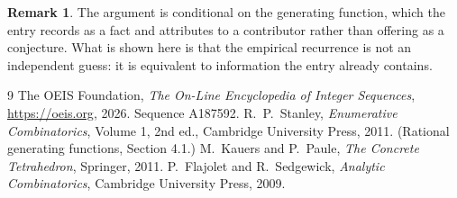 \documentclass[11pt,a4paper]{article}
\theoremstyle{plain}
\theoremstyle{definition}
\newtheorem{remark}[theorem]{Remark}
\begin{document}
\begin{remark}
The argument is conditional on the generating function, which the entry records as a fact and
attributes to a contributor rather than offering as a conjecture. What is shown here is that
the empirical recurrence is not an independent guess: it is equivalent to information the
entry already contains.
\end{remark}

\begin{thebibliography}{9}
 The OEIS Foundation, \emph{The On-Line Encyclopedia of Integer
Sequences}, \url{https://oeis.org}, 2026. Sequence A187592.
 R.~P.~Stanley, \emph{Enumerative Combinatorics}, Volume 1, 2nd ed.,
Cambridge University Press, 2011. (Rational generating functions, Section 4.1.)
 M.~Kauers and P.~Paule, \emph{The Concrete Tetrahedron}, Springer, 2011.
 P.~Flajolet and R.~Sedgewick, \emph{Analytic Combinatorics}, Cambridge
University Press, 2009.
\end{thebibliography}
\end{document}
